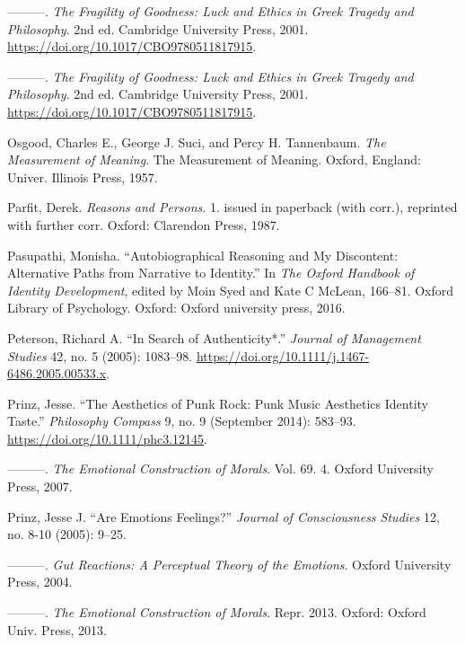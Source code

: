 \documentclass[phdthesis,12pt,final]{wuthesis}
\newlength{\cslhangindent}
\newenvironment{CSLReferences}[2] %
{\begin{list}{}{%
	\setlength{\itemindent}{0pt}
	\setlength{\leftmargin}{0pt}
	\setlength{\parsep}{0pt}
	\ifodd #1
	\setlength{\leftmargin}{\cslhangindent}
	\setlength{\itemindent}{-1\cslhangindent}
	\fi
	\setlength{\itemsep}{#2\baselineskip}}}
{\end{list}}
\theoremstyle{definition}
\theoremstyle{definition}
\theoremstyle{definition}
\theoremstyle{definition}
\theoremstyle{remark}
\begin{document}
\begin{CSLReferences}{1}{0}
---------. \emph{The {Fragility} of {Goodness}: {Luck} and {Ethics} in {Greek Tragedy} and {Philosophy}}. 2nd ed. Cambridge University Press, 2001. \url{https://doi.org/10.1017/CBO9780511817915}.

---------. \emph{The {Fragility} of {Goodness}: {Luck} and {Ethics} in {Greek Tragedy} and {Philosophy}}. 2nd ed. Cambridge University Press, 2001. \url{https://doi.org/10.1017/CBO9780511817915}.

Osgood, Charles E., George J. Suci, and Percy H. Tannenbaum. \emph{The Measurement of Meaning}. The Measurement of Meaning. Oxford, England: Univer. Illinois Press, 1957.

Parfit, Derek. \emph{Reasons and Persons}. 1. issued in paperback (with corr.), reprinted with further corr. Oxford: Clarendon Press, 1987.

Pasupathi, Monisha. {``Autobiographical {Reasoning} and {My} {Discontent}: {Alternative Paths} from {Narrative} to {Identity}.''} In \emph{The {Oxford} Handbook of Identity Development}, edited by Moin Syed and Kate C McLean, 166--81. Oxford Library of Psychology. Oxford: Oxford university press, 2016.

Peterson, Richard A. {``In {Search} of {Authenticity}*.''} \emph{Journal of Management Studies} 42, no. 5 (2005): 1083--98. \url{https://doi.org/10.1111/j.1467-6486.2005.00533.x}.

Prinz, Jesse. {``The {Aesthetics} of {Punk Rock}: {Punk Music Aesthetics Identity Taste}.''} \emph{Philosophy Compass} 9, no. 9 (September 2014): 583--93. \url{https://doi.org/10.1111/phc3.12145}.

---------. \emph{The {Emotional Construction} of {Morals}}. Vol. 69. 4. Oxford University Press, 2007.

Prinz, Jesse J. {``Are Emotions Feelings?''} \emph{Journal of Consciousness Studies} 12, no. 8-10 (2005): 9--25.

---------. \emph{Gut {Reactions}: {A Perceptual Theory} of the {Emotions}}. Oxford University Press, 2004.

---------. \emph{The {Emotional Construction} of {Morals}}. Repr. 2013. Oxford: Oxford Univ. Press, 2013.


\end{CSLReferences}
\end{document}
